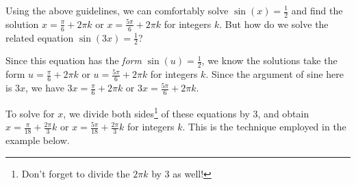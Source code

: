 \documentclass{ximera}
\begin{document}
Using the above guidelines, we can comfortably solve $\sin(x) = \frac{1}{2}$ and find the solution $x = \frac{\pi}{6} + 2\pi k$ or $x = \frac{5\pi}{6} + 2\pi k$ for integers $k$.  But how do we solve the related equation $\sin(3x) = \frac{1}{2}$?

 

 Since this equation has the \textit{form} $\sin(u) = \frac{1}{2}$, we know the solutions take the form  $u= \frac{\pi}{6} + 2\pi k$ or $u = \frac{5\pi}{6} + 2\pi k$ for integers $k$. Since the argument of sine here is $3x$, we have $3x= \frac{\pi}{6} + 2\pi k$ or $3x = \frac{5\pi}{6} + 2\pi k$.
 
  
 
 To solve for $x$, we divide both sides\footnote{Don't forget to divide the $2\pi k$ by $3$ as well!} of these equations by $3$, and obtain $x = \frac{\pi}{18} + \frac{2\pi}{3} k$ or $x = \frac{5\pi}{18} + \frac{2\pi}{3}k$ for integers $k$.  This is the technique employed in the example below.
\end{document}
